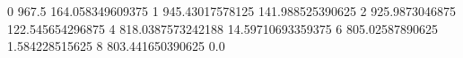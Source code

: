 0 967.5 164.058349609375
1 945.43017578125 141.988525390625
2 925.9873046875 122.545654296875
4 818.0387573242188 14.59710693359375
6 805.02587890625 1.584228515625
8 803.441650390625 0.0
